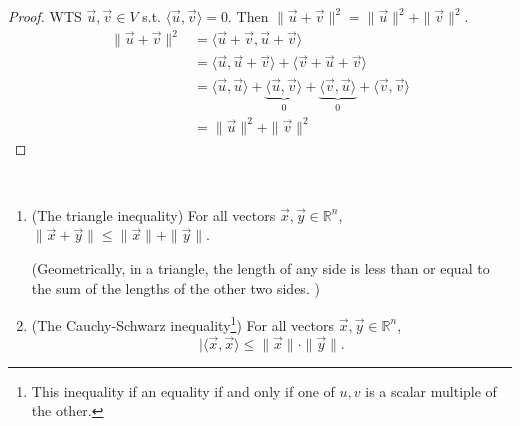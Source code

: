 \documentclass[11pt,fleqn]{book} %
\begin{document}
\begin{proof}
    WTS $\vec{u}, \vec{v} \in V$ s.t. $\langle \vec{u}, \vec{v} \rangle = 0$. Then $\|\vec{u} + \vec{v}\|^2 = \|\vec{u}\|^2 + \|\vec{v}\|^2$.
    \begin{align*}
        \|\vec{u} + \vec{v}\|^2
        &= \langle \vec{u} + \vec{v}, \vec{u} + \vec{v} \rangle
        \\
        &= \langle \vec{u}, \vec{u} + \vec{v} \rangle + \langle \vec{v} + \vec{u} + \vec{v} \rangle
        \\
        &=
        \langle \vec{u}, \vec{u} \rangle + \underbrace{\langle \vec{u}, \vec{v} \rangle}_{0} + \underbrace{\langle \vec{v}, \vec{u} \rangle}_{0} + \langle \vec{v}, \vec{v} \rangle
        \\
        &= \|\vec{u}\|^2 + \|\vec{v}\|^2
    \end{align*}
\end{proof}

\setcounter{chapter}{4}
\setcounter{dummy}{3}
\begin{proposition}
$\text{ }$

    \begin{enumerate}[label=\alph*)]
        \item (The triangle inequality) For all vectors $\vec{x}, \vec{y} \in \mathbb{R}^n$, $\| \vec{x} + \vec{y} \| \le \|\vec{x}\| + \|\vec{y}\|$.

        (Geometrically, in a triangle, the length of any side is less than or equal to the sum of the lengths of the other two sides. )
        \begin{center}
        \end{center}

        \item (The Cauchy-Schwarz inequality\footnote{This inequality if an equality if and only if one of $u, v$ is a scalar multiple of the other. }) For all vectors $\vec{x}, \vec{y} \in \mathbb{R}^n$, $$| \langle \vec{x}, \vec{x} \rangle \le \|\vec{x}\| \cdot \|\vec{y}\|. $$
    \end{enumerate}
\end{proposition}
\setcounter{chapter}{3}
\end{document}
